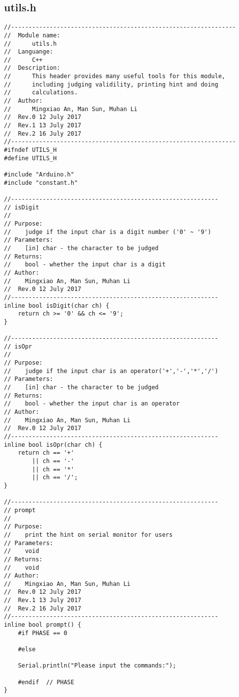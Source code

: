 \subsection{utils.h}
\begin{verbatim}
//----------------------------------------------------------------
//  Module name:
//      utils.h
//  Languange:
//      C++
//  Description:
//      This header provides many useful tools for this module,
//      including judging validility, printing hint and doing
//      calculations.
//  Author:
//      Mingxiao An, Man Sun, Muhan Li
//  Rev.0 12 July 2017
//  Rev.1 13 July 2017
//  Rev.2 16 July 2017
//----------------------------------------------------------------
#ifndef UTILS_H
#define UTILS_H

#include "Arduino.h"
#include "constant.h"

//-----------------------------------------------------------  
// isDigit
//  
// Purpose:  
//    judge if the input char is a digit number ('0' ~ '9')
// Parameters:  
//    [in] char - the character to be judged
// Returns:  
//    bool - whether the input char is a digit  
// Author:  
//    Mingxiao An, Man Sun, Muhan Li
//  Rev.0 12 July 2017
//-----------------------------------------------------------  
inline bool isDigit(char ch) {
    return ch >= '0' && ch <= '9';
}

//-----------------------------------------------------------  
// isOpr
//  
// Purpose:  
//    judge if the input char is an operator('+','-','*','/')
// Parameters:  
//    [in] char - the character to be judged
// Returns:  
//    bool - whether the input char is an operator 
// Author:  
//    Mingxiao An, Man Sun, Muhan Li
//  Rev.0 12 July 2017
//-----------------------------------------------------------
inline bool isOpr(char ch) {
    return ch == '+' 
        || ch == '-' 
        || ch == '*' 
        || ch == '/';
}

//-----------------------------------------------------------  
// prompt
//  
// Purpose:  
//    print the hint on serial monitor for users
// Parameters:  
//    void
// Returns:  
//    void 
// Author:  
//    Mingxiao An, Man Sun, Muhan Li
//  Rev.0 12 July 2017
//  Rev.1 13 July 2017
//  Rev.2 16 July 2017
//-----------------------------------------------------------
inline bool prompt() {
    #if PHASE == 0

    #else

    Serial.println("Please input the commands:");

    #endif  // PHASE
}


\end{verbatim}
